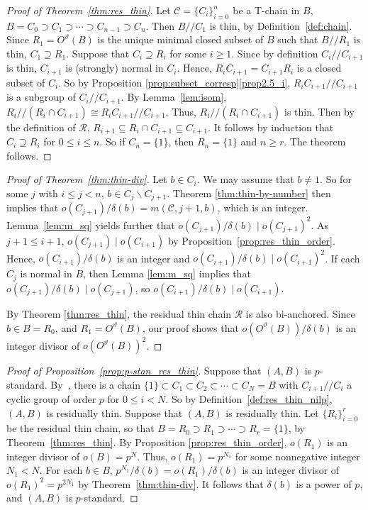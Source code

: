 \documentclass[ALCO,ThmDefs,Unicode,epreuves]{cedram}
\begin{document}
\begin{proof} [Proof of Theorem~\ref{thm:res_thin}] 
Let $\mathcal{C} = \{C_i\}_{i=0}^n$ be a T-chain in $B$, $B = C_0
\supset C_1 \supset \cdots \supset C_{n-1} \supset C_n$. Then $B//C_1$
is thin, by Definition~\ref{def:chain}. Since $R_1 = O^{\vartheta}(B)$
is the unique minimal closed subset of $B$ such that $B//R_1$ is thin,
$C_1 \supseteq R_1$. Suppose that $C_i \supseteq R_i$ for some $i \geq
1$. Since by definition $C_i//C_{i+1}$ is thin, $C_{i+1}$ is (strongly)
normal in $C_i$. Hence, $R_iC_{i+1} = C_{i+1}R_i$ is a closed subset of
$C_i$. So by Proposition
\ref{prop:subset_corresp}\ref{prop2.5_i}, $R_iC_{i+1}//C_{i+1}$ is a subgroup of
$C_i//C_{i+1}$. By Lemma~\ref{lem:isom}, $R_i//(R_i\cap C_{i+1}) \cong
R_iC_{i+1}//C_{i+1}$. Thus, $R_i//(R_i\cap C_{i+1})$ is thin. Then by
the definition of $\mathcal{R}$, $R_{i+1} \subseteq R_i\cap C_{i+1}
\subseteq C_{i+1}$. It follows by induction that $C_i \supseteq R_i$
for $0 \leq i \leq n$. So if $C_n = \{1\}$, then $R_n = \{1\}$ and $n
\geq r$. The theorem follows.
\end{proof}

\begin{proof} [Proof of Theorem~\ref{thm:thin-div}]
Let $b \in C_i$. We may assume that $b \neq 1$. So for some $j$ with
$i \leq j < n$, $b \in C_j\backslash C_{j+1}$. Theorem
\ref{thm:thin-by-number} then implies that $o(C_{j+1})/\delta(b) =
m(\mathcal{C}, j+1, b)$, which is an integer. Lemma~\ref{lem:m_sq}
yields further that $o(C_{j+1})/\delta(b) \mid o(C_{j+1})^2$. As $j+1 \leq i+1$,
$o(C_{j+1}) \mid o(C_{i+1})$ by Proposition~\ref{prop:res_thin_order}.
Hence, $o(C_{i+1})/\delta(b)$ is an integer and $o(C_{i+1})/\delta(b) 
\mid o(C_{i+1})^2$. If each $C_j$ is normal in $B$, then Lemma
\ref{lem:m_sq} implies that $o(C_{j+1})/\delta(b) \mid o(C_{j+1})$, so
$o(C_{i+1})/\delta(b) \mid o(C_{i+1})$. 

By Theorem
\ref{thm:res_thin}, the residual thin chain $\mathcal{R}$ is also
bi-anchored. Since $b \in B = R_0$, and $R_1 = O^{\vartheta}(B)$, our
proof shows that $o(O^{\vartheta}(B))/\delta(b)$ is an integer divisor
of $o(O^{\vartheta}(B))^2$.
\end{proof}

\begin{proof} [Proof of Proposition~\ref{prop:p-stan_res_thin}]
Suppose that $(A, B)$ is $p$-standard. By~\cite [Proposition~3.2]{BC},
there is a chain $\{1\} \subset C_1 \subset C_2 \subset \cdots \subset
C_N = B$ with $C_{i+1}//C_i$ a cyclic group of order $p$ for $0 \leq i <
N$. So by Definition~\ref{def:res_thin_nilp}, $(A, B)$ is residually
thin.
Suppose that $(A, B)$ is residually thin. Let $\{R_i\}_{i=0}^r$ be the
residual thin chain, so that $B = R_0 \supset R_1 \supset \cdots \supset
R_r = \{1\}$, by Theorem~\ref{thm:res_thin}. By Proposition
\ref{prop:res_thin_order}, $o(R_1)$ is an integer divisor of $o(B) =
p^N$. Thus, $o(R_1) = p^{N_1}$ for some nonnegative integer $N_1 < N$.
For each $b \in B$, $p^{N_1}/\delta(b) = o(R_1)/\delta(b)$ is an integer
divisor of $o(R_1)^2 = p^{2N_1}$ by Theorem~\ref{thm:thin-div}. It
follows that $\delta(b)$ is a power of $p$, and $(A, B)$ is
$p$-standard.
\end{proof}
 
\end{document}
